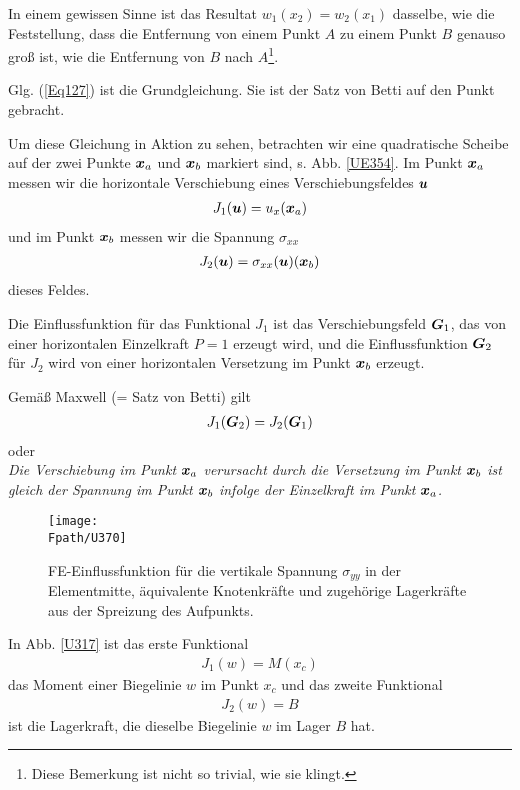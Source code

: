 In einem gewissen Sinne ist das Resultat $w_1(x_2) = w_2(x_1)$ dasselbe, wie die Feststellung, dass die Entfernung von einem Punkt $A$ zu einem Punkt $B$ genauso gro{\ss} ist, wie die Entfernung von $B$ nach $A$\footnote{Diese Bemerkung ist nicht so trivial, wie sie klingt.}.

Glg. (\ref{Eq127}) ist die Grundgleichung. Sie ist der Satz von Betti auf den Punkt gebracht.

Um diese Gleichung in Aktion zu sehen, betrachten wir eine quadratische  Scheibe auf der zwei Punkte $\mbox{\boldmath $x$}_a$ und $\mbox{\boldmath $x$}_b$ markiert sind, s. Abb. \ref{UE354}. Im Punkt $\mbox{\boldmath $x$}_a$ messen wir die horizontale Verschiebung eines Verschiebungsfeldes $\mbox{\boldmath $u$}$
\begin{align}
J_1(\mbox{\boldmath $u$}) = u_x(\mbox{\boldmath $x$}_a)
\end{align}
und im Punkt $\mbox{\boldmath $x$}_b$ messen wir die Spannung $\sigma_{xx}$
\begin{align}
J_2(\mbox{\boldmath $u$}) = \sigma_{xx}(\mbox{\boldmath $u$}) (\mbox{\boldmath $x$}_b)
\end{align}
dieses Feldes.

Die Einflussfunktion f\"{u}r das Funktional $J_1$ ist das Verschiebungsfeld $\mbox{\boldmath $G$}_1$, das von einer horizontalen Einzelkraft $P = 1$ erzeugt wird, und die Einflussfunktion $\mbox{\boldmath $G$}_2$ f\"{u}r $J_2$ wird von einer horizontalen Versetzung im Punkt $\mbox{\boldmath $x$}_b$ erzeugt.

Gem\"{a}{\ss} Maxwell (= Satz von Betti) gilt
\begin{align}\label{Eq172}
J_1(\mbox{\boldmath $G$}_2) = J_2(\mbox{\boldmath $G$}_1)
\end{align}
oder\\

{\em Die Verschiebung im Punkt $\mbox{\boldmath $x$}_a$ verursacht durch die Versetzung im Punkt $\mbox{\boldmath $x$}_b$ ist gleich der Spannung im Punkt $\mbox{\boldmath $x$}_b$ infolge der Einzelkraft im Punkt $\mbox{\boldmath $x$}_a$.\/}\\

\begin{figure}
\centering
{\texttt{[image: \\Fpath/U370]}}
  \caption{FE-Einflussfunktion f\"{u}r die vertikale Spannung $\sigma_{yy}$ in der Elementmitte, \"{a}quivalente Knotenkr\"{a}fte und zugeh\"{o}rige Lagerkr\"{a}fte aus der Spreizung des Aufpunkts.}
  \label{U370}\label{Korrektur19}
\end{figure}
In Abb. \ref{U317} ist das erste Funktional
\begin{align}
J_1(w) = M(x_c)
\end{align}
das Moment einer Biegelinie $w$ im Punkt $x_c$ und das zweite Funktional
\begin{align}
J_2(w) = B
\end{align}
ist die Lagerkraft, die dieselbe Biegelinie $w$ im Lager $B$ hat.

